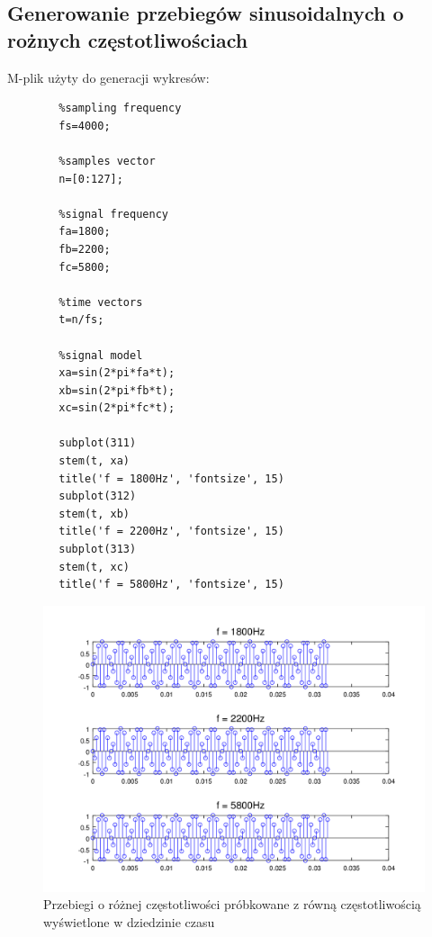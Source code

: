 \documentclass[12pt,titlepage]{report}
\begin{document}
\subsection{Generowanie przebiegów sinusoidalnych o rożnych częstotliwościach}
M-plik użyty do generacji wykresów:
\begin{multicols}{3}
	{
		\tiny
		\begin{verbatim}
		%sampling frequency
		fs=4000;
		
		%samples vector
		n=[0:127];
		
		%signal frequency
		fa=1800;
		fb=2200;
		fc=5800;
		
		%time vectors
		t=n/fs;
		
		%signal model
		xa=sin(2*pi*fa*t);
		xb=sin(2*pi*fb*t);
		xc=sin(2*pi*fc*t);
		
		subplot(311)
		stem(t, xa)
		title('f = 1800Hz', 'fontsize', 15)
		subplot(312)
		stem(t, xb)
		title('f = 2200Hz', 'fontsize', 15)
		subplot(313)
		stem(t, xc)
		title('f = 5800Hz', 'fontsize', 15)
		\end{verbatim}
	}
\end{multicols}
\begin{figure}[!h]
	\centering
	\includegraphics[scale=0.7]{../cw14_output}
	\caption{Przebiegi o różnej częstotliwości próbkowane z równą częstotliwością wyświetlone w dziedzinie czasu}
\end{figure}
\newpage
\end{document}
